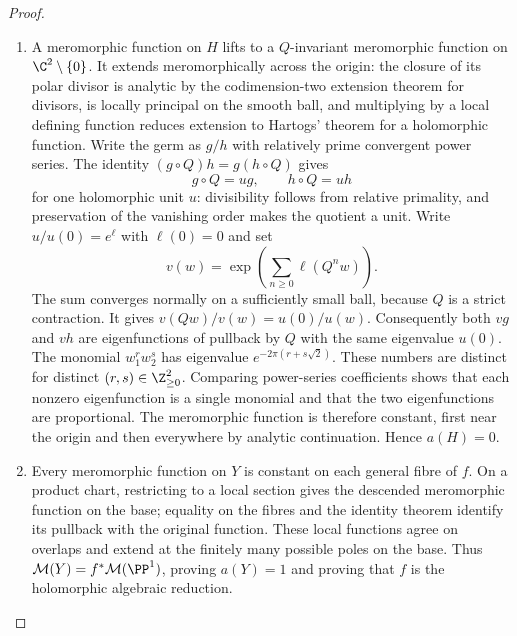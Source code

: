 \begin{proof}
\begin{enumerate}[label=\arabic*.,leftmargin=*]
\item A meromorphic function on $H$ lifts
to a $Q$-invariant meromorphic function on $\C^2\setminus\{0\}$.
It extends meromorphically across the origin: the closure of its
polar divisor is analytic by the codimension-two extension theorem
for divisors, is locally principal on the smooth ball, and
multiplying by a local defining function reduces extension to
Hartogs' theorem for a holomorphic function. Write the germ as
$g/h$ with relatively prime convergent power series. The identity
$(g\circ Q)h=g(h\circ Q)$ gives
\[
g\circ Q=ug,\qquad h\circ Q=uh
\]
for one holomorphic unit $u$: divisibility follows from relative
primality, and preservation of the vanishing order makes the
quotient a unit. Write $u/u(0)=e^\ell$ with $\ell(0)=0$ and set
\[
v(w)=\exp\left(\sum_{n\ge0}\ell(Q^nw)\right).
\]
The sum converges normally on a sufficiently small ball, because
$Q$ is a strict contraction. It gives
$v(Qw)/v(w)=u(0)/u(w)$. Consequently both $vg$ and $vh$ are
eigenfunctions of pullback by $Q$ with the same eigenvalue $u(0)$.
The monomial $w_1^rw_2^s$ has eigenvalue
$e^{-2\pi(r+s\sqrt2)}$. These numbers are distinct for distinct
$(r,s)\in\Z_{\ge0}^2$. Comparing power-series coefficients shows
that each nonzero eigenfunction is a single monomial and that the
two eigenfunctions are proportional. The meromorphic function is
therefore constant, first near the origin and then everywhere by
analytic continuation. Hence $a(H)=0$.

\item Every meromorphic function on $Y$ is constant on each general
fibre of $f$. On a product chart, restricting to a local section
gives the descended meromorphic function on the base; equality on
the fibres and the identity theorem identify its pullback with
the original function. These local functions agree on overlaps
and extend at the finitely many possible poles on the base.
Thus $\mathcal M(Y)=f^*\mathcal M(\PP^1)$, proving $a(Y)=1$
and proving that $f$ is the holomorphic algebraic reduction.


\end{enumerate}
\end{proof}
